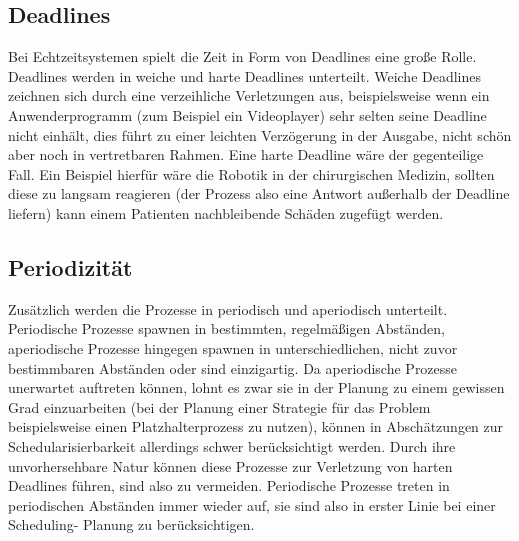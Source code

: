 \subsection{Deadlines}
Bei Echtzeitsystemen spielt die Zeit in Form von Deadlines eine große Rolle. Deadlines werden in weiche und 
harte Deadlines unterteilt. Weiche Deadlines zeichnen sich durch eine verzeihliche Verletzungen aus, 
beispielsweise wenn ein Anwenderprogramm (zum Beispiel ein Videoplayer) sehr selten seine Deadline nicht 
einhält, dies führt zu einer leichten Verzögerung in der Ausgabe, nicht schön aber noch in vertretbaren 
Rahmen. Eine harte Deadline wäre der gegenteilige Fall. Ein Beispiel hierfür wäre die Robotik in der 
chirurgischen Medizin, sollten diese zu langsam reagieren (der Prozess also eine Antwort außerhalb der 
Deadline liefern) kann einem Patienten nachbleibende Schäden zugefügt werden. 

\subsection{Periodizität}
Zusätzlich werden die Prozesse in periodisch und aperiodisch unterteilt. Periodische Prozesse spawnen in 
bestimmten, regelmäßigen Abständen, aperiodische Prozesse hingegen spawnen in unterschiedlichen, nicht 
zuvor bestimmbaren Abständen oder sind einzigartig. Da aperiodische Prozesse unerwartet auftreten können, 
lohnt es zwar sie in der Planung zu einem gewissen Grad einzuarbeiten (bei der Planung einer Strategie für 
das Problem beispielsweise einen Platzhalterprozess zu nutzen), können in Abschätzungen zur 
Schedularisierbarkeit allerdings schwer berücksichtigt werden. Durch ihre unvorhersehbare Natur können 
diese Prozesse zur Verletzung von harten Deadlines führen, sind also zu vermeiden. Periodische Prozesse 
treten in periodischen Abständen immer wieder auf, sie sind also in erster Linie bei einer Scheduling-
Planung zu berücksichtigen.

